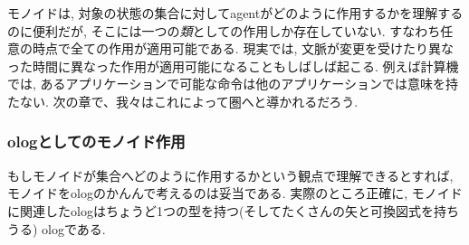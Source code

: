 \begin{remark}


モノイドは, 対象の状態の集合に対してagentがどのように作用するかを理解するのに便利だが, そこには一つの\emph{類}としての作用しか存在していない. すなわち任意の時点で全ての作用が適用可能である. 現実では, 文脈が変更を受けたり異なった時間に異なった作用が適用可能になることもしばしば起こる. 例えば計算機では, あるアプリケーションで可能な命令は他のアプリケーションでは意味を持たない. 次の章で、我々はこれによって圏へと導かれるだろう.

\end{remark}



\subsubsection{ologとしてのモノイド作用}


もしモノイドが集合へどのように作用するかという観点で理解できるとすれば, モノイドをologのかんんで考えるのは妥当である. 実際のところ正確に, モノイドに関連したologはちょうど1つの型を持つ(そしてたくさんの矢と可換図式を持ちうる) ologである. 


